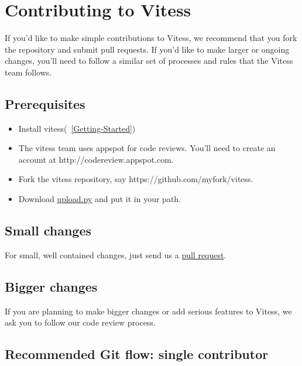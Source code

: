 \section{Contributing to Vitess}\hypertarget{contributing-to-vitess}{}\label{contributing-to-vitess}

If you'd like to make simple contributions to Vitess, we recommend that you fork
the repository and submit pull requests. If you'd like to make larger or ongoing
changes, you'll need to follow a similar set of processes and rules that the
Vitess team follows.

\subsection{Prerequisites}\hypertarget{prerequisites}{}\label{prerequisites}

\begin{itemize}
\item Install vitess(~\ref{Getting-Started})
\item The vitess team uses appspot for code reviews. You'll need to create an account at http://codereview.appspot.com.
\item Fork the vitess repository, say https://github.com/myfork/vitess.
\item Download \href{https://code.google.com/p/rietveld/wiki/UploadPyUsage}{upload.py} and put it in your path.
\end{itemize}

\subsection{Small changes}\hypertarget{small-changes}{}\label{small-changes}

For small, well contained changes, just send us a
\href{https://help.github.com/articles/using-pull-requests}{pull request}.

\subsection{Bigger changes}\hypertarget{bigger-changes}{}\label{bigger-changes}

If you are planning to make bigger changes or add serious features to Vitess, we
ask you to follow our code review process.

\subsection{Recommended Git flow: single contributor}\hypertarget{recommended-git-flow-single-contributor}{}\label{recommended-git-flow-single-contributor}

